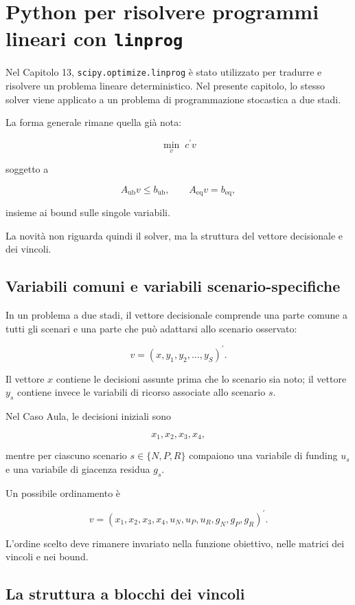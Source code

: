 \section{Python per risolvere programmi lineari con \texttt{linprog}}

Nel Capitolo 13, \texttt{scipy.optimize.linprog} \`e stato utilizzato per
tradurre e risolvere un problema lineare deterministico. Nel presente
capitolo, lo stesso solver viene applicato a un problema di programmazione
stocastica a due stadi.

La forma generale rimane quella gi\`a nota:

\[
\min_{v}\; c^{\prime}v
\]

\noindent soggetto a

\[
A_{\mathrm{ub}}v\leq b_{\mathrm{ub}},
\qquad
A_{\mathrm{eq}}v=b_{\mathrm{eq}},
\]

\noindent insieme ai bound sulle singole variabili.

La novit\`a non riguarda quindi il solver, ma la struttura del vettore
decisionale e dei vincoli.

\subsection{Variabili comuni e variabili scenario-specifiche}

In un problema a due stadi, il vettore decisionale comprende una parte comune
a tutti gli scenari e una parte che pu\`o adattarsi allo scenario osservato:

\[
v=
\left(
x,
y_1,
y_2,
\ldots,
y_S
\right)^{\prime}.
\]

Il vettore \(x\) contiene le decisioni assunte prima che lo scenario sia noto;
il vettore \(y_s\) contiene invece le variabili di ricorso associate allo
scenario \(s\).

Nel Caso Aula, le decisioni iniziali sono

\[
x_1,x_2,x_3,x_4,
\]

\noindent mentre per ciascuno scenario
\(s\in\{N,P,R\}\) compaiono una variabile di funding \(u_s\) e una variabile di giacenza
residua \(g_s\).

Un possibile ordinamento \`e

\[
v=
\left(
x_1,x_2,x_3,x_4,
u_N,u_P,u_R,
g_N,g_P,g_R
\right)^{\prime}.
\]

L'ordine scelto deve rimanere invariato nella funzione obiettivo, nelle
matrici dei vincoli e nei bound.

\subsection{La struttura a blocchi dei vincoli}

